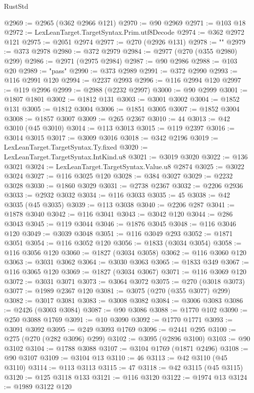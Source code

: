 \begin{lexlean}{RustStd}
\begin{coremodule}
@2969 := @2965 (@362 @2966 @121)
@2970 := @90 @2969
@2971 := @103 @18
@2972 := LexLeanTarget.TargetSyntax.Prim.utf8Decode
@2974 := @362 @2972 @121
@2975 := @2051 @2974
@2977 := @270 (@2926 @131)
@2978 := ""
@2979 := @373 @2978
@2980 := @372 @2979
@2984 := @2977 (@270 (@355 @2980) @299)
@2986 := @2971 (@2975 @2984)
@2987 := @90 @2986
@2988 := @103 @20
@2989 := "pass"
@2990 := @373 @2989
@2991 := @372 @2990
@2993 := @116 @2991 @120
@2994 := @2237 @2993
@2996 := @116 @2994 @120
@2997 := @119 @2996
@2999 := @2988 (@2232 @2997)
@3000 := @90 @2999
@3001 := @1807 @1801
@3002 := @1812 @131
@3003 := @3001 @3002
@3004 := @1852 @131
@3005 := @1812 @3004
@3006 := @1851 @3005
@3007 := @1852 @3004
@3008 := @1857 @3007
@3009 := @265 @2367
@3010 := 44
@3013 := @42 @3010 (@45 @3010)
@3014 := @113 @3013
@3015 := @119 @2397
@3016 := @3014 @3015
@3017 := @3009 @3016
@3018 := @342 @2196
@3019 := LexLeanTarget.TargetSyntax.Ty.fixed
@3020 := LexLeanTarget.TargetSyntax.IntKind.u8
@3021 := @3019 @3020
@3022 := @136 @3021
@3024 := LexLeanTarget.TargetSyntax.Value.u8 @2874
@3025 := @3022 @3024
@3027 := @116 @3025 @120
@3028 := @384 @3027
@3029 := @2232 @3028
@3030 := @1860 @3029
@3031 := @2738 @2367
@3032 := @2206 @2936
@3033 := @2932 @3032
@3034 := @116 @3033
@3035 := 45
@3038 := @42 @3035 (@45 @3035)
@3039 := @113 @3038
@3040 := @2206 @287
@3041 := @1878 @3040
@3042 := @116 @3041
@3043 := @3042 @120
@3044 := @286 @3043
@3045 := @119 @3044
@3046 := @1876 @3045
@3048 := @116 @3046 @120
@3049 := @3039 @3048
@3051 := @116 @3049 @293
@3052 := @1871 @3051
@3054 := @116 @3052 @120
@3056 := @1833 (@3034 @3054)
@3058 := @116 @3056 @120
@3060 := @1827 (@3034 @3058)
@3062 := @116 @3060 @120
@3063 := @3031 @3062
@3064 := @3030 @3063
@3065 := @1833 @349
@3067 := @116 @3065 @120
@3069 := @1827 (@3034 @3067)
@3071 := @116 @3069 @120
@3072 := @3031 @3071
@3073 := @3064 @3072
@3075 := @270 (@3018 @3073)
@3077 := @1989 @2367 @120
@3081 := @3075 (@270 (@355 @3077) @299)
@3082 := @3017 @3081
@3083 := @3008 @3082
@3084 := @3006 @3083
@3086 := @2426 (@3003 @3084)
@3087 := @90 @3086
@3088 := @1770 @102
@3090 := @250 @3088 @1769
@3091 := @10 @3090
@3092 := @1770 @1771
@3093 := @3091 @3092
@3095 := @249 @3093 @1769
@3096 := @2441 @295
@3100 := @275 (@270 (@282 @3096) @299)
@3102 := @3095 (@2896 @3100)
@3103 := @90 @3102
@3104 := @1788 @3088
@3107 := @3104 @1769 (@1871 @2496)
@3108 := @90 @3107
@3109 := @3104 @13
@3110 := 46
@3113 := @42 @3110 (@45 @3110)
@3114 := @113 @3113
@3115 := 47
@3118 := @42 @3115 (@45 @3115)
@3120 := @125 @3118 @133
@3121 := @116 @3120
@3122 := @1974 @13
@3124 := @1989 @3122 @120

\end{coremodule}
\end{lexlean}
